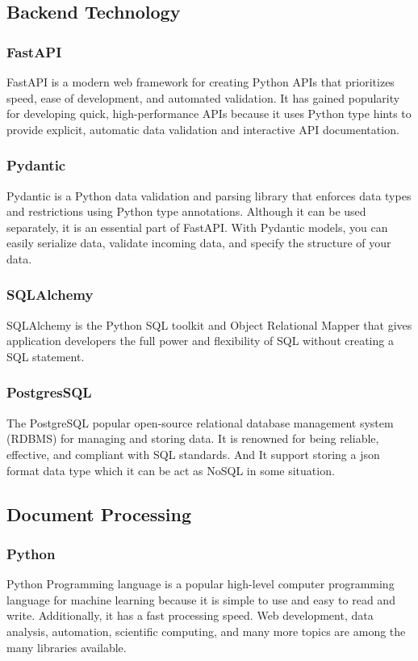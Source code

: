 \documentclass[12pt,oneside,openright,a4paper]{cpe-english-project}
\begin{document}
\subsection{Backend Technology}
\subsubsection{FastAPI} FastAPI is a modern web framework for creating Python APIs that prioritizes speed, ease of development, and automated validation. It has gained popularity for developing quick, high-performance APIs because it uses Python type hints to provide explicit, automatic data validation and interactive API documentation.

\subsubsection{Pydantic} Pydantic is a Python data validation and parsing library that enforces data types and restrictions using Python type annotations. Although it can be used separately, it is an essential part of FastAPI. With Pydantic models, you can easily serialize data, validate incoming data, and specify the structure of your data.

\subsubsection{SQLAlchemy} SQLAlchemy is the Python SQL toolkit and Object Relational Mapper that gives application developers the full power and flexibility of SQL without creating a SQL statement.

\subsubsection{PostgresSQL} The PostgreSQL popular open-source relational database management system (RDBMS) for managing and storing data. It is renowned for being reliable, effective, and compliant with SQL standards. And It support storing a json format data type which it can be act as NoSQL in some situation.

\subsection{Document Processing}
\subsubsection{Python} Python Programming language is a popular high-level computer programming language for machine learning because it is simple to use and easy to read and write. Additionally, it has a fast processing speed. Web development, data analysis, automation, scientific computing, and many more topics are among the many libraries available.
\end{document}
